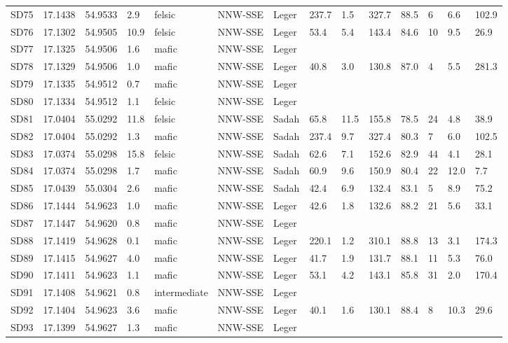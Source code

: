 \begin{tabular}{llllllllllllll}
SD75 & 17.1438 & 54.9533 & 2.9 & felsic & NNW-SSE & Leger & 237.7 & 1.5 & 327.7 & 88.5 & 6 & 6.6 & 102.9 \\
SD76 & 17.1302 & 54.9505 & 10.9 & felsic & NNW-SSE & Leger & 53.4 & 5.4 & 143.4 & 84.6 & 10 & 9.5 & 26.9 \\
SD77 & 17.1325 & 54.9506 & 1.6 & mafic & NNW-SSE & Leger &  &  &  &  &  &  &  \\
SD78 & 17.1329 & 54.9506 & 1.0 & mafic & NNW-SSE & Leger & 40.8 & 3.0 & 130.8 & 87.0 & 4 & 5.5 & 281.3 \\
SD79 & 17.1335 & 54.9512 & 0.7 & mafic & NNW-SSE & Leger &  &  &  &  &  &  &  \\
SD80 & 17.1334 & 54.9512 & 1.1 & felsic & NNW-SSE & Leger &  &  &  &  &  &  &  \\
SD81 & 17.0404 & 55.0292 & 11.8 & felsic & NNW-SSE & Sadah & 65.8 & 11.5 & 155.8 & 78.5 & 24 & 4.8 & 38.9 \\
SD82 & 17.0404 & 55.0292 & 1.3 & mafic & NNW-SSE & Sadah & 237.4 & 9.7 & 327.4 & 80.3 & 7 & 6.0 & 102.5 \\
SD83 & 17.0374 & 55.0298 & 15.8 & felsic & NNW-SSE & Sadah & 62.6 & 7.1 & 152.6 & 82.9 & 44 & 4.1 & 28.1 \\
SD84 & 17.0374 & 55.0298 & 1.7 & mafic & NNW-SSE & Sadah & 60.9 & 9.6 & 150.9 & 80.4 & 22 & 12.0 & 7.7 \\
SD85 & 17.0439 & 55.0304 & 2.6 & mafic & NNW-SSE & Sadah & 42.4 & 6.9 & 132.4 & 83.1 & 5 & 8.9 & 75.2 \\
SD86 & 17.1444 & 54.9623 & 1.0 & mafic & NNW-SSE & Leger & 42.6 & 1.8 & 132.6 & 88.2 & 21 & 5.6 & 33.1 \\
SD87 & 17.1447 & 54.9620 & 0.8 & mafic & NNW-SSE & Leger &  &  &  &  &  &  &  \\
SD88 & 17.1419 & 54.9628 & 0.1 & mafic & NNW-SSE & Leger & 220.1 & 1.2 & 310.1 & 88.8 & 13 & 3.1 & 174.3 \\
SD89 & 17.1415 & 54.9627 & 4.0 & mafic & NNW-SSE & Leger & 41.7 & 1.9 & 131.7 & 88.1 & 11 & 5.3 & 76.0 \\
SD90 & 17.1411 & 54.9623 & 1.1 & mafic & NNW-SSE & Leger & 53.1 & 4.2 & 143.1 & 85.8 & 31 & 2.0 & 170.4 \\
SD91 & 17.1408 & 54.9621 & 0.8 & intermediate & NNW-SSE & Leger &  &  &  &  &  &  &  \\
SD92 & 17.1404 & 54.9623 & 3.6 & mafic & NNW-SSE & Leger & 40.1 & 1.6 & 130.1 & 88.4 & 8 & 10.3 & 29.6 \\
SD93 & 17.1399 & 54.9627 & 1.3 & mafic & NNW-SSE & Leger &  &  &  &  &  &  &  \\

\end{tabular}
